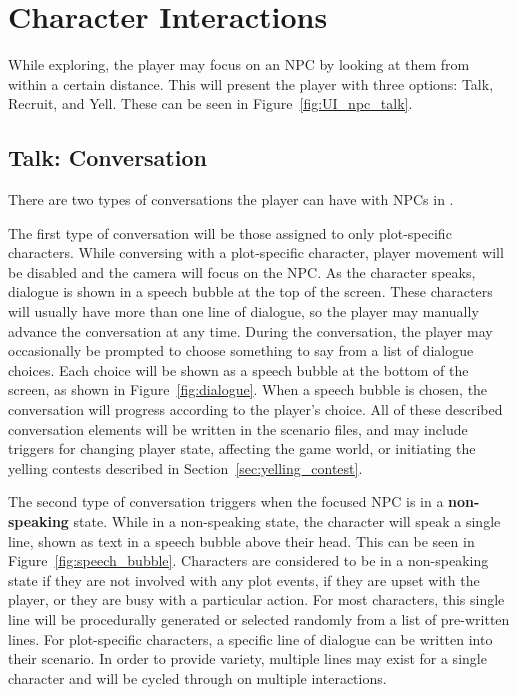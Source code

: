 \section{Character Interactions}
While exploring, the player may focus on an NPC by looking at them from within a certain distance. This will present the player with three options: Talk, Recruit, and Yell. These can be seen in Figure~\ref{fig:UI_npc_talk}.

\subsection{Talk: Conversation}
\label{sec:conversation}
There are two types of conversations the player can have with NPCs in \ourgame{}.

The first type of conversation will be those assigned to only plot-specific characters. While conversing with a plot-specific character, player movement will be disabled and the camera will focus on the NPC. As the character speaks, dialogue is shown in a speech bubble at the top of the screen. These characters will usually have more than one line of dialogue, so the player may manually advance the conversation at any time. During the conversation, the player may occasionally be prompted to choose something to say from a list of dialogue choices. Each choice will be shown as a speech bubble at the bottom of the screen, as shown in Figure~\ref{fig:dialogue}. When a speech bubble is chosen, the conversation will progress according to the player's choice. All of these described conversation elements will be written in the scenario files, and may include triggers for changing player state, affecting the game world, or initiating the yelling contests described in Section~\ref{sec:yelling_contest}.

The second type of conversation triggers when the focused NPC is in a \textbf{non-speaking} state. While in a non-speaking state, the character will speak a single line, shown as text in a speech bubble above their head. This can be seen in Figure~\ref{fig:speech_bubble}. Characters are considered to be in a non-speaking state if they are not involved with any plot events, if they are upset with the player, or they are busy with a particular action. For most characters, this single line will be procedurally generated or selected randomly from a list of pre-written lines. For plot-specific characters, a specific line of dialogue can be written into their scenario. In order to provide variety, multiple lines may exist for a single character and will be cycled through on multiple interactions.

